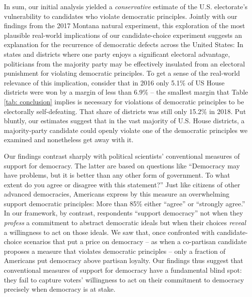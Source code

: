 \documentclass[letterpaper, 12pt]{article}
\begin{document}
\begin{raggedright}
In sum, our initial analysis yielded a \emph{conservative} estimate of the U.S. electorate's vulnerability to candidates who violate democratic principles. Jointly with our findings from the 2017 Montana natural experiment, this exploration of the most plausible real-world implications of our candidate-choice experiment suggests an explanation for the recurrence of democratic defects across the United States: In states and districts where one party enjoys a significant electoral advantage, politicians from the majority party may be effectively insulated from an electoral punishment for violating democratic principles. To get a sense of the real-world relevance of this implication, consider that in 2016 only 5.1\% of US House districts were won by a margin of less than 6.9\% -- the smallest margin that Table \ref{tab: conclusion} implies is necessary for violations of democratic principles to be electorally self-defeating. That share of districts was still only 15.2\% in 2018. Put bluntly, our estimates suggest that in the vast majority of U.S. House districts, a majority-party candidate could openly violate one of the democratic principles we examined and nonetheless get away with it.

Our findings contrast sharply with political scientists' conventional measures of support for democracy. The latter are based on questions like ``Democracy may have problems, but it is better than any other form of government. To what extent do you agree or disagree with this statement?'' Just like citizens of other advanced democracies, Americans express by this measure an overwhelming support democratic principles: More than 85\% either ``agree'' or ``strongly agree.'' In our framework, by contrast, respondents ``support democracy'' not when they \emph{profess} a commitment to abstract democratic ideals but when their choices \emph{reveal} a willingness to act on those ideals. We saw that, once confronted with candidate-choice scenarios that put a price on democracy -- as when a co-partisan candidate proposes a measure that violates democratic principles -- only a fraction of Americans put democracy above partisan loyalty. Our findings thus suggest that conventional measures of support for democracy have a fundamental blind spot: they fail to capture voters' willingness to act on their commitment to democracy precisely when democracy is at stake.


\end{raggedright}
\end{document}
